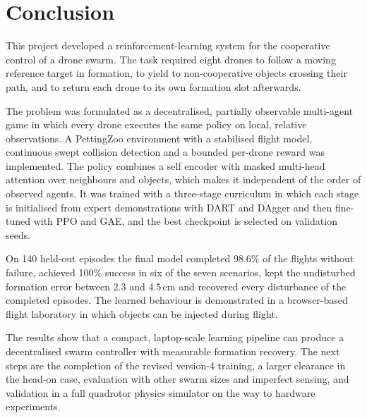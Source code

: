 \chapter{Conclusion}
\label{ch:conclusion}

This project developed a reinforcement-learning system for the cooperative control of a drone swarm. The task
required eight drones to follow a moving reference target in formation, to yield to non-cooperative objects
crossing their path, and to return each drone to its own formation slot afterwards.

The problem was formulated as a decentralised, partially observable multi-agent game in which every drone
executes the same policy on local, relative observations. A PettingZoo environment with a stabilised flight
model, continuous swept collision detection and a bounded per-drone reward was implemented. The policy combines
a self encoder with masked multi-head attention over neighbours and objects, which makes it independent of the
order of observed agents. It was trained with a three-stage curriculum in which each stage is initialised from
expert demonstrations with DART and DAgger and then fine-tuned with PPO and GAE, and the best checkpoint is
selected on validation seeds.

On 140 held-out episodes the final model completed 98.6\% of the flights without failure, achieved 100\%
success in six of the seven scenarios, kept the undisturbed formation error between 2.3 and 4.5\,cm and
recovered every disturbance of the completed episodes. The learned behaviour is demonstrated in a browser-based
flight laboratory in which objects can be injected during flight.

The results show that a compact, laptop-scale learning pipeline can produce a decentralised swarm controller
with measurable formation recovery. The next steps are the completion of the revised version-4 training, a
larger clearance in the head-on case, evaluation with other swarm sizes and imperfect sensing, and validation in
a full quadrotor physics simulator on the way to hardware experiments.
